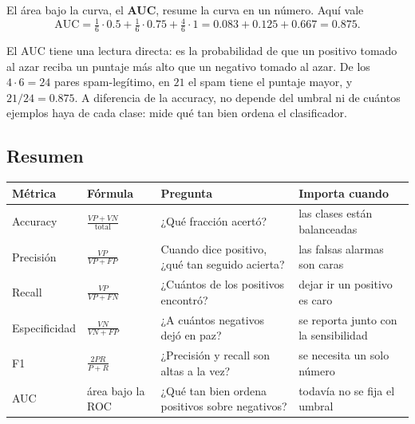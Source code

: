 \documentclass[11pt,letterpaper]{article}
\begin{document}
El área bajo la curva, el \textbf{AUC}, resume la curva en un número.
Aquí vale
\[
    \text{AUC} = \tfrac{1}{6} \cdot 0.5 + \tfrac{1}{6} \cdot 0.75
               + \tfrac{4}{6} \cdot 1 = 0.083 + 0.125 + 0.667 = 0.875 .
\]

\begin{idea}
    El AUC tiene una lectura directa: es la probabilidad de que un
    positivo tomado al azar reciba un puntaje más alto que un negativo
    tomado al azar. De los $4 \cdot 6 = 24$ pares spam-legítimo, en
    $21$ el spam tiene el puntaje mayor, y $21 / 24 = 0.875$. A
    diferencia de la accuracy, no depende del umbral ni de cuántos
    ejemplos haya de cada clase: mide qué tan bien ordena el
    clasificador.
\end{idea}


\subsection*{Resumen}

\begin{center}
\small
\begin{tabular}{l>{\raggedright\arraybackslash}p{2.6cm}%
                 >{\raggedright\arraybackslash}p{4.8cm}%
                 >{\raggedright\arraybackslash}p{3.8cm}}
    \toprule
    \textbf{Métrica} & \textbf{Fórmula} & \textbf{Pregunta}
    & \textbf{Importa cuando} \\
    \midrule
    Accuracy & $\frac{VP + VN}{\text{total}}$
             & ¿Qué fracción acertó?
             & las clases están balanceadas \\
    \addlinespace
    Precisión & $\frac{VP}{VP + FP}$
              & Cuando dice positivo, ¿qué tan seguido acierta?
              & las falsas alarmas son caras \\
    \addlinespace
    Recall & $\frac{VP}{VP + FN}$
           & ¿Cuántos de los positivos encontró?
           & dejar ir un positivo es caro \\
    \addlinespace
    Especificidad & $\frac{VN}{VN + FP}$
                  & ¿A cuántos negativos dejó en paz?
                  & se reporta junto con la sensibilidad \\
    \addlinespace
    F1 & $\frac{2PR}{P + R}$
       & ¿Precisión y recall son altas a la vez?
       & se necesita un solo número \\
    \addlinespace
    AUC & área bajo la ROC
        & ¿Qué tan bien ordena positivos sobre negativos?
        & todavía no se fija el umbral \\
    \bottomrule
\end{tabular}
\end{center}
\end{document}
